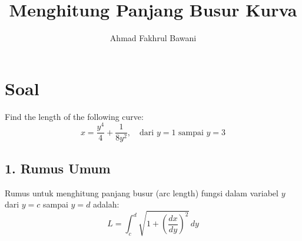 \documentclass[12pt,a4paper]{article}
\title{Menghitung Panjang Busur Kurva}
\author{Ahmad Fakhrul Bawani}
\date{}
\begin{document}
\maketitle

\section*{Soal}

Find the length of the following curve:
\begin{equation*}
  x = \frac{y^4}{4} + \frac{1}{8y^2}, \quad \text{dari } y = 1 \text{ sampai } y = 3
\end{equation*}

\subsection*{1. Rumus Umum}
Rumus untuk menghitung panjang busur (arc length) fungsi dalam variabel $y$ dari $y = c$ sampai $y = d$ adalah:
\begin{equation*}
  L = \int_{c}^{d} \sqrt{1 + \left(\frac{dx}{dy}\right)^2} \, dy
\end{equation*}
\end{document}
